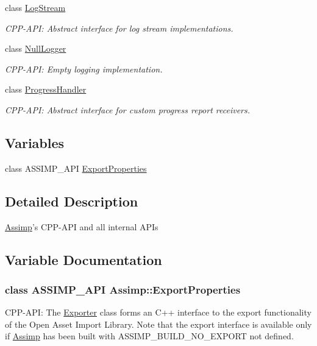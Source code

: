 \begin{DoxyCompactItemize}
class \hyperlink{class_assimp_1_1_log_stream}{Log\-Stream}
\begin{DoxyCompactList}\small\item\em C\-P\-P-\/\-A\-P\-I\-: Abstract interface for log stream implementations. \end{DoxyCompactList}\item 
class \hyperlink{class_assimp_1_1_null_logger}{Null\-Logger}
\begin{DoxyCompactList}\small\item\em C\-P\-P-\/\-A\-P\-I\-: Empty logging implementation. \end{DoxyCompactList}\item 
class \hyperlink{class_assimp_1_1_progress_handler}{Progress\-Handler}
\begin{DoxyCompactList}\small\item\em C\-P\-P-\/\-A\-P\-I\-: Abstract interface for custom progress report receivers. \end{DoxyCompactList}\end{DoxyCompactItemize}
\subsection*{Variables}
\begin{DoxyCompactItemize}
\item 
class A\-S\-S\-I\-M\-P\-\_\-\-A\-P\-I \hyperlink{namespace_assimp_a81d358b0d2907db3ffe185d60f41aa83}{Export\-Properties}
\end{DoxyCompactItemize}


\subsection{Detailed Description}
\hyperlink{namespace_assimp}{Assimp}'s C\-P\-P-\/\-A\-P\-I and all internal A\-P\-Is 

\subsection{Variable Documentation}
\hypertarget{namespace_assimp_a81d358b0d2907db3ffe185d60f41aa83}{
\subsubsection[{Export\-Properties}]{\setlength{\rightskip}{0pt plus 5cm}class A\-S\-S\-I\-M\-P\-\_\-\-A\-P\-I {\bf Assimp\-::\-Export\-Properties}}}\label{namespace_assimp_a81d358b0d2907db3ffe185d60f41aa83}
C\-P\-P-\/\-A\-P\-I\-: The \hyperlink{class_assimp_1_1_exporter}{Exporter} class forms an C++ interface to the export functionality of the Open Asset Import Library. Note that the export interface is available only if \hyperlink{namespace_assimp}{Assimp} has been built with A\-S\-S\-I\-M\-P\-\_\-\-B\-U\-I\-L\-D\-\_\-\-N\-O\-\_\-\-E\-X\-P\-O\-R\-T not defined.

